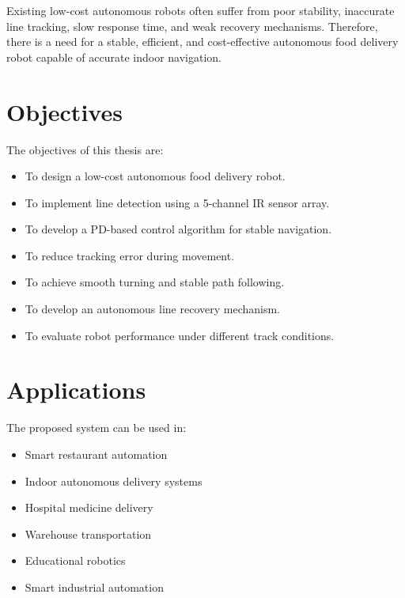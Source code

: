 \documentclass[12pt,a4paper,oneside]{report}
\begin{document}
Existing low-cost autonomous robots often suffer from poor stability, inaccurate line tracking, slow response time, and weak recovery mechanisms. Therefore, there is a need for a stable, efficient, and cost-effective autonomous food delivery robot capable of accurate indoor navigation.


\section{Objectives}

The objectives of this thesis are:

\begin{itemize}
\item To design a low-cost autonomous food delivery robot.
\item To implement line detection using a 5-channel IR sensor array.
\item To develop a PD-based control algorithm for stable navigation.
\item To reduce tracking error during movement.
\item To achieve smooth turning and stable path following.
\item To develop an autonomous line recovery mechanism.
\item To evaluate robot performance under different track conditions.
\end{itemize}


\section{Applications}

The proposed system can be used in:

\begin{itemize}
\item Smart restaurant automation
\item Indoor autonomous delivery systems
\item Hospital medicine delivery
\item Warehouse transportation
\item Educational robotics
\item Smart industrial automation
\end{itemize}
\end{document}
